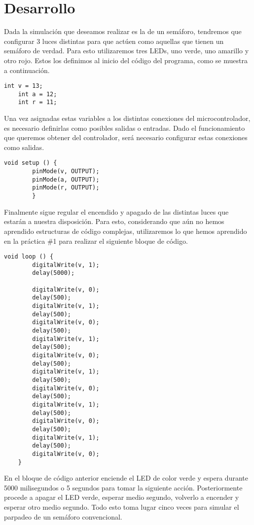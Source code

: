 \documentclass[12pt, letterpaper]{article}
\begin{document}
\section*{Desarrollo}
Dada la simulación que deseamos realizar es la de un semáforo, tendremos que configurar 3 luces distintas para que actúen como aquellas que tienen un semáforo de verdad. Para esto utilizaremos tres LEDs, uno verde, uno amarillo y otro rojo. Estos los definimos al inicio del código del programa, como se muestra a continuación.

\begin{lstlisting}[language=Arduino]
	int v = 13;
	int a = 12;
	int r = 11;
\end{lstlisting}

Una vez asignadas estas variables a los distintas conexiones del microcontrolador, es necesario definirlas como posibles salidas o entradas. Dado el funcionamiento que queremos obtener del controlador, será necesario configurar estas conexiones como salidas.

\begin{lstlisting}[language=Arduino]
	void setup () {
		pinMode(v, OUTPUT);
		pinMode(a, OUTPUT);
		pinMode(r, OUTPUT);
		}
\end{lstlisting}

Finalmente sigue regular el encendido y apagado de las distintas luces que estarán a nuestra disposición. Para esto, considerando que aún no hemos aprendido estructuras de código complejas, utilizaremos lo que hemos aprendido en la práctica \#1 para realizar el siguiente bloque de código.

\begin{lstlisting}[language=Arduino]
	void loop () {
		digitalWrite(v, 1);
		delay(5000);

		digitalWrite(v, 0);
		delay(500);
		digitalWrite(v, 1);
		delay(500);
		digitalWrite(v, 0);
		delay(500);
		digitalWrite(v, 1);
		delay(500);
		digitalWrite(v, 0);
		delay(500);
		digitalWrite(v, 1);
		delay(500);
		digitalWrite(v, 0);
		delay(500);
		digitalWrite(v, 1);
		delay(500);
		digitalWrite(v, 0);
		delay(500);
		digitalWrite(v, 1);
		delay(500);
		digitalWrite(v, 0);
	}
\end{lstlisting}

En el bloque de código anterior enciende el LED de color verde y espera durante 5000 milisegundos o 5 segundos para tomar la siguiente acción. Posteriormente procede a apagar el LED verde, esperar medio segundo, volverlo a encender y esperar otro medio segundo. Todo esto toma lugar cinco veces para simular el parpadeo de un semáforo convencional.
\end{document}
